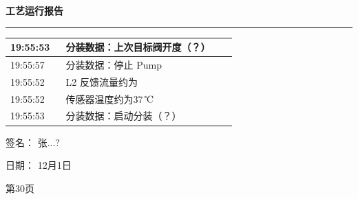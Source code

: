 \documentclass[UTF8,10pt,a4paper,fontset=fandol]{ctexart}
\newcommand{\fieldvalue}[1]{#1}
\newcommand{\handwritten}[1]{#1}
\begin{document}
\hfill
\begin{minipage}[t]{0.47\linewidth}
\centering
\textbf{工艺运行报告}

\vspace{2pt}
\hrule
\vspace{4pt}

\scriptsize
\begin{tabular}{|p{0.22\linewidth}|p{0.68\linewidth}|}
\hline
19:55:53 & 分装数据：上次目标阀开度（？） \\
\hline
19:55:57 & 分装数据：停止 Pump \\
\hline
19:55:52 & L2 反馈流量约为 \\
\hline
19:55:52 & 传感器温度约为37\,℃ \\
\hline
19:55:53 & 分装数据：启动分装（？） \\
\hline
\end{tabular}

\vspace{8pt}

\raggedright
签名：%
\fieldvalue{\handwritten{张...?}}

日期：%
\fieldvalue{\handwritten{12月1日}}

\vfill
第30页
\end{minipage}

\vspace{18pt}
\end{document}
